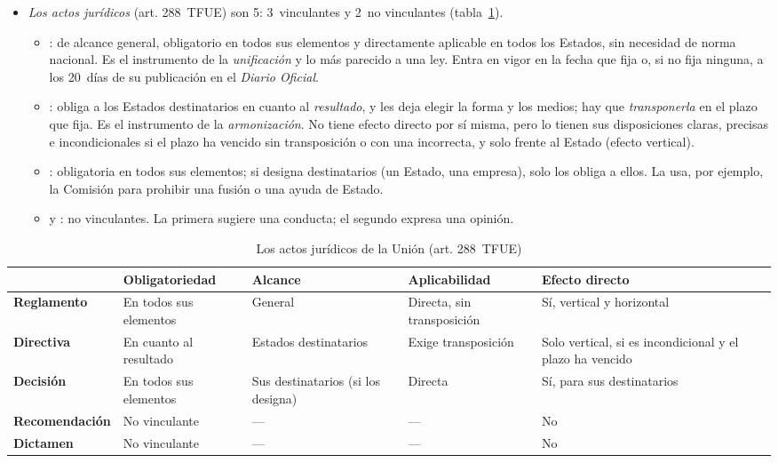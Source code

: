 \documentclass[11pt]{article}
\begin{document}
\begin{itemize}
\item \emph{Los actos jurídicos} (art. 288~TFUE) son 5: 3~vinculantes y 2~no vinculantes (tabla~\ref{tab:actos}).
  \begin{itemize}
  \item {}: de alcance general, obligatorio en todos sus elementos y directamente aplicable en todos los Estados, sin necesidad de norma nacional. Es el instrumento de la \emph{unificación} y lo más parecido a una ley. Entra en vigor en la fecha que fija o, si no fija ninguna, a los 20~días de su publicación en el \emph{Diario Oficial}.
  \item {}: obliga a los Estados destinatarios en cuanto al \emph{resultado}, y les deja elegir la forma y los medios; hay que \emph{transponerla} en el plazo que fija. Es el instrumento de la \emph{armonización}. No tiene efecto directo por sí misma, pero lo tienen sus disposiciones claras, precisas e incondicionales si el plazo ha vencido sin transposición o con una incorrecta, y solo frente al Estado (efecto vertical).
  \item {}: obligatoria en todos sus elementos; si designa destinatarios (un Estado, una empresa), solo los obliga a ellos. La usa, por ejemplo, la Comisión para prohibir una fusión o una ayuda de Estado.
  \item {} y : no vinculantes. La primera sugiere una conducta; el segundo expresa una opinión.
  \end{itemize}
\end{itemize}

\begin{table}[H]
\centering
\caption{Los actos jurídicos de la Unión (art. 288~TFUE)}\label{tab:actos}
\small
\begin{tabular}{>{\raggedright\arraybackslash}m{2.75cm}>{\raggedright\arraybackslash}m{2.75cm}>{\raggedright\arraybackslash}m{2.75cm}>{\raggedright\arraybackslash}m{2.6cm}>{\raggedright\arraybackslash}m{2.9cm}}
\hline
& \textbf{Obligatoriedad} & \textbf{Alcance} & \textbf{Aplicabilidad} & \textbf{Efecto directo}\\
\hline
\textbf{Reglamento} & En todos sus elementos & General & Directa, sin transposición & Sí, vertical y horizontal\\
\textbf{Directiva} & En cuanto al resultado & Estados destinatarios & Exige transposición & Solo vertical, si es incondicional y el plazo ha vencido\\
\textbf{Decisión} & En todos sus elementos & Sus destinatarios (si los designa) & Directa & Sí, para sus destinatarios\\
\textbf{Recomendación} & No vinculante & --- & --- & No\\
\textbf{Dictamen} & No vinculante & --- & --- & No\\
\hline
\end{tabular}
\end{table}
\end{document}
